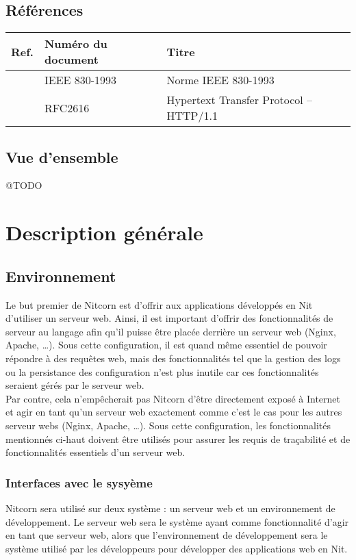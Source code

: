 \documentclass{scrreprt}
\begin{document}
\section{Références}
\begin{tabularx}{\textwidth}{|l|X|l|}
    \hline
    Ref. & Numéro du document & Titre \\
    \hline
    \cite{ieefr} & IEEE 830-1993 & Norme IEEE 830-1993 \\
    \hline
    \cite{http} & RFC2616 & Hypertext Transfer Protocol -- HTTP/1.1 \\
    \hline
\end{tabularx}

\section{Vue d'ensemble}
@TODO
\chapter{Description générale}
\section{Environnement}
Le but premier de Nitcorn est d'offrir aux applications développés en Nit d'utiliser
un serveur web. Ainsi, il est important d'offrir des fonctionnalités de serveur
au langage afin qu'il puisse être placée derrière un serveur web (Nginx, Apache, \ldots).
Sous cette configuration, il est quand même essentiel de pouvoir répondre à des
requêtes web, mais des fonctionnalités tel que la gestion des logs ou la persistance
des configuration n'est plus inutile car ces fonctionnalités seraient gérés par
le serveur web.\\
Par contre, cela n'empêcherait pas Nitcorn d'être directement exposé à Internet
et agir en tant qu'un serveur web exactement comme c'est le cas pour les autres
serveur webs (Nginx, Apache, \ldots). Sous cette configuration, les fonctionnalités
mentionnés ci-haut doivent être utilisés pour assurer les requis de traçabilité
et de fonctionnalités essentiels d'un serveur web.
\subsection{Interfaces avec le sysyème}
Nitcorn sera utilisé sur deux système : un serveur web et un environnement de développement.
Le serveur web sera le système ayant comme fonctionnalité d'agir en tant que serveur web, alors
que l'environnement de développement sera le système utilisé par les développeurs
pour développer des applications web en Nit.
\end{document}
